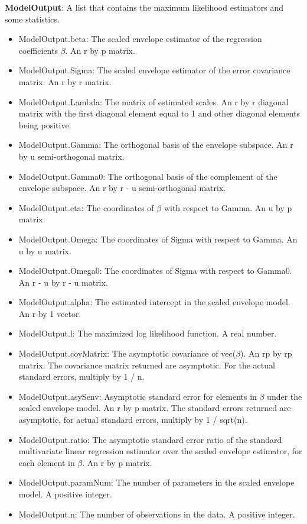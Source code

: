 \documentclass[a4paper,11pt,openany]{memoir}
\begin{document}
\begin{par}
\textbf{ModelOutput}: A list that contains the maximum likelihood estimators and some statistics.
\end{par} \vspace{1em}
\begin{itemize}
\setlength{\itemsep}{-1ex}
   \item ModelOutput.beta: The scaled envelope estimator of the regression coefficients $\beta$. An r by p matrix.
   \item ModelOutput.Sigma: The scaled envelope estimator of the error covariance matrix.  An r by r matrix.
   \item ModelOutput.Lambda: The matrix of estimated scales. An r by r diagonal matrix with the first diagonal element equal to 1 and other diagonal elements being positive.
   \item ModelOutput.Gamma: The orthogonal basis of the envelope subspace. An r by u semi-orthogonal matrix.
   \item ModelOutput.Gamma0: The orthogonal basis of the complement of the envelope subspace.  An r by r - u semi-orthogonal matrix.
   \item ModelOutput.eta: The coordinates of $\beta$ with respect to Gamma. An u by p matrix.
   \item ModelOutput.Omega: The coordinates of Sigma with respect to Gamma. An u by u matrix.
   \item ModelOutput.Omega0: The coordinates of Sigma with respect to Gamma0. An r - u by r - u matrix.
   \item ModelOutput.alpha: The estimated intercept in the scaled envelope model.  An r by 1 vector.
   \item ModelOutput.l: The maximized log likelihood function.  A real number.
   \item ModelOutput.covMatrix: The asymptotic covariance of vec($\beta$).  An rp by rp matrix.  The covariance matrix returned are asymptotic.  For the actual standard errors, multiply by 1 / n.
   \item ModelOutput.asySenv: Asymptotic standard error for elements in $\beta$ under the scaled envelope model.  An r by p matrix.  The standard errors returned are asymptotic, for actual standard errors, multiply by 1 / sqrt(n).
   \item ModelOutput.ratio: The asymptotic standard error ratio of the standard multivariate linear regression estimator over the scaled envelope estimator, for each element in $\beta$.  An r by p matrix.
   \item ModelOutput.paramNum: The number of parameters in the scaled envelope model.  A positive integer.
   \item ModelOutput.n: The number of observations in the data.  A positive integer.
\end{itemize}
\end{document}

